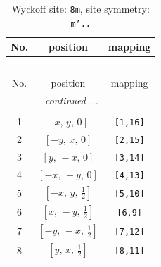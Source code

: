 \documentclass[fleqn,8pt]{jsarticle}
\begin{document}
\begin{longtable}{ccc}
\caption{Wyckoff site: {\tt 8m}, site symmetry: {\tt m'..}}
 \\
 \hline \hline
No. & position & mapping \\ \hline \endfirsthead

\multicolumn{2}{l}{\tablename\ \thetable{}} \\
 \hline \hline
No. & position & mapping \\ \hline \endhead

 \hline \hline
\multicolumn{2}{r}{\footnotesize\it continued ...} \\ \endfoot

 \hline \hline
\multicolumn{2}{r}{} \\ \endlastfoot

1 & $\left[ x,\, y,\, 0 \right]$ & {\tt [1,16]} \\ \hline
2 & $\left[ - y,\, x,\, 0 \right]$ & {\tt [2,15]} \\ \hline
3 & $\left[ y,\, - x,\, 0 \right]$ & {\tt [3,14]} \\ \hline
4 & $\left[ - x,\, - y,\, 0 \right]$ & {\tt [4,13]} \\ \hline
5 & $\left[ - x,\, y,\, \frac{1}{2} \right]$ & {\tt [5,10]} \\ \hline
6 & $\left[ x,\, - y,\, \frac{1}{2} \right]$ & {\tt [6,9]} \\ \hline
7 & $\left[ - y,\, - x,\, \frac{1}{2} \right]$ & {\tt [7,12]} \\ \hline
8 & $\left[ y,\, x,\, \frac{1}{2} \right]$ & {\tt [8,11]} \\
\end{longtable}
\renewcommand{\arraystretch}{1.2}
\end{document}
